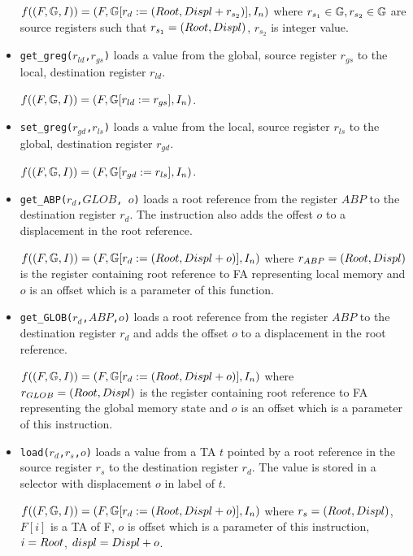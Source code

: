 \begin{itemize}
		$f((F, \mathbb{G}, I)) = (F, \mathbb{G} [r_d := (Root,Displ + r_{s_2})], I_n)$
		where $r_{s_1} \in \mathbb{G}, r_{s_2} \in \mathbb{G}$ are source registers such that
		$r_{s_1}=(Root,Displ)$, $r_{s_2}$ is integer value.
	
	\item {\tt get\_greg($r_{ld}$,$r_{gs}$)} loads a value from the global, source register $r_{gs}$ to
		the local, destination register $r_{ld}$.
		
		$f((F, \mathbb{G}, I)) = (F, \mathbb{G} [r_{ld} := r_{gs}], I_n)$.
	
	\item {\tt set\_greg($r_{gd}$,$r_{ls}$)} loads a value from the local, source register $r_{ls}$ to
		the global, destination register $r_{gd}$.
		
		$f((F, \mathbb{G}, I)) = (F, \mathbb{G} [r_{gd} := r_{ls}], I_n)$.
	
	\item {\tt get\_ABP($r_d$,$GLOB$, $o$)} loads a root reference from the register $ABP$ to
		the destination register $r_d$. The instruction also adds the offest $o$ to a displacement
		in the root reference.

		$f((F, \mathbb{G}, I)) = (F, \mathbb{G} [r_d := 
			(Root,Displ + o)], I_n)$ where $r_{ABP}=(Root,Displ)$ is the register containing root
		reference to FA representing local memory and $o$ is an offset
		which is a parameter of this function.
	
	\item {\tt get\_GLOB($r_d$,$ABP$,$o$)} loads a root reference from the register $ABP$
		to the destination register $r_d$ and adds the offset $o$ to a displacement in the root reference.
		
		$f((F, \mathbb{G}, I)) = (F, \mathbb{G} [r_{d} := 
				(Root,Displ + o)
			], I_n)$ where $r_{GLOB}=(Root,Displ)$ is the register containing root
			reference to FA representing the global memory state and $o$ is an offset
			which is a parameter of this instruction.
	
	\item {\tt load($r_d$,$r_s$,$o$)} loads a value from a TA $t$ pointed
		by a root reference in the source register $r_s$ to the destination register $r_d$.
		The value is stored in a selector with displacement $o$ in label of $t$.
		
		$f((F, \mathbb{G}, I)) = (F, \mathbb{G} [r_{d} := 
				(Root,Displ + o)
			], I_n)$
			where $r_{s}=(Root,Displ)$,
			$F[i]$ is a TA of F,
			$o$ is offset which is a parameter of this instruction,
			$i=Root$,
			$displ=Displ + o$.


\end{itemize}
